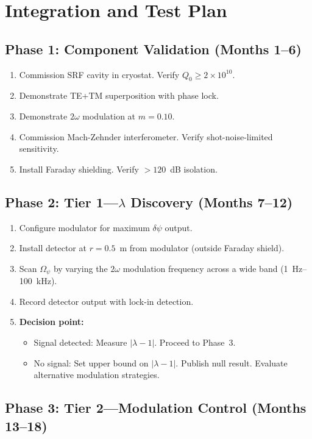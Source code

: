 \documentclass[11pt,letterpaper]{article}
\newcommand{\ee}[1]{\times 10^{#1}}
\newcommand{\psifield}{\psi}
\begin{document}
\section{Integration and Test Plan}
\label{sec:test_plan}

\subsection{Phase 1: Component Validation (Months 1--6)}

\begin{enumerate}
\item Commission SRF cavity in cryostat. Verify $Q_0 \geq 2\ee{10}$.
\item Demonstrate TE+TM superposition with phase lock.
\item Demonstrate $2\omega$ modulation at $m = 0.10$.
\item Commission Mach-Zehnder interferometer. Verify shot-noise-limited
sensitivity.
\item Install Faraday shielding. Verify $>120$~dB isolation.
\end{enumerate}

\subsection{Phase 2: Tier 1---$\lambda$ Discovery (Months 7--12)}

\begin{enumerate}
\item Configure modulator for maximum $\delta\psifield$ output.
\item Install detector at $r = 0.5$~m from modulator (outside
Faraday shield).
\item Scan $\Omega_\psi$ by varying the $2\omega$ modulation
frequency across a wide band (1~Hz--100~kHz).
\item Record detector output with lock-in detection.
\item \textbf{Decision point:}
\begin{itemize}
\item Signal detected: Measure $|\lambda-1|$. Proceed to Phase~3.
\item No signal: Set upper bound on $|\lambda-1|$. Publish null
result. Evaluate alternative modulation strategies.
\end{itemize}
\end{enumerate}

\subsection{Phase 3: Tier 2---Modulation Control (Months 13--18)}
\end{document}
